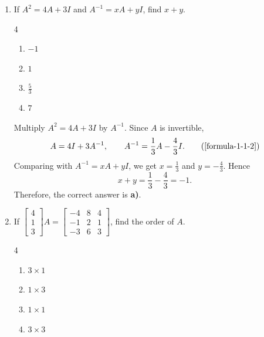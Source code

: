 \begin{enumerate}[label={},leftmargin=1.15cm,labelwidth=1.0cm,labelsep=0.15cm,itemindent=0pt,listparindent=0pt,itemsep=\baselineskip,parsep=0pt,topsep=0pt]
\item[3.1.2] If $A^2=4A+3I$ and $A^{-1}=xA+yI$, find $x+y$.

\begin{multicols}{4}
\begin{enumerate}
\setlength{\itemsep}{0pt}
    \item $-1$
    \item $1$
    \item $\frac53$
    \item $7$
\end{enumerate}
\end{multicols}

\vspace{0.6em}\par\solution


Multiply $A^2=4A+3I$ by $A^{-1}$. Since $A$ is invertible,
\begin{equation*}
A=4I+3A^{-1},\qquad A^{-1}=\frac13A-\frac43I.
\tag*{(\ref{formula-1-1-2})}\end{equation*}
Comparing with $A^{-1}=xA+yI$, we get $x=\frac13$ and $y=-\frac43$. Hence
\[
x+y=\frac13-\frac43=-1.
\]
Therefore, the correct answer is \textbf{a)}.
\item[3.1.4] If $\begin{bmatrix}4\\1\\3\end{bmatrix}A=\begin{bmatrix}-4&8&4\\-1&2&1\\-3&6&3\end{bmatrix}$, find the order of $A$.

\begin{multicols}{4}
\begin{enumerate}
\setlength{\itemsep}{0pt}
    \item $3\times1$
    \item $1\times3$
    \item $1\times1$
    \item $3\times3$
\end{enumerate}
\end{multicols}

\vspace{0.6em}\par\solution



\end{enumerate}
